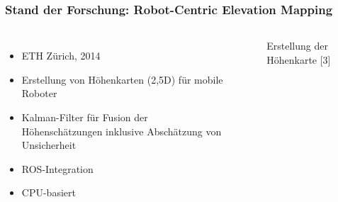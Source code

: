     \begin{frame}[t]
    \frametitle{Stand der Forschung: Robot-Centric Elevation Mapping}

    \begin{columns}[t]
      \column[]{6cm}
      
      \begin{itemize}
      \item  ETH Zürich, 2014
      \item  Erstellung von Höhenkarten (2,5D) für mobile Roboter 
      \item  Kalman-Filter für Fusion der Höhenschätzungen inklusive Abschätzung von Unsicherheit
      \item  ROS-Integration 
      \item  CPU-basiert


     \end{itemize}
     

      \column{6cm}
      
       \begin{figure}[h]
 	\centering
 	\caption{Erstellung der Höhenkarte [3]} 
       \end{figure}
  
    \end{columns}
    \end{frame}

